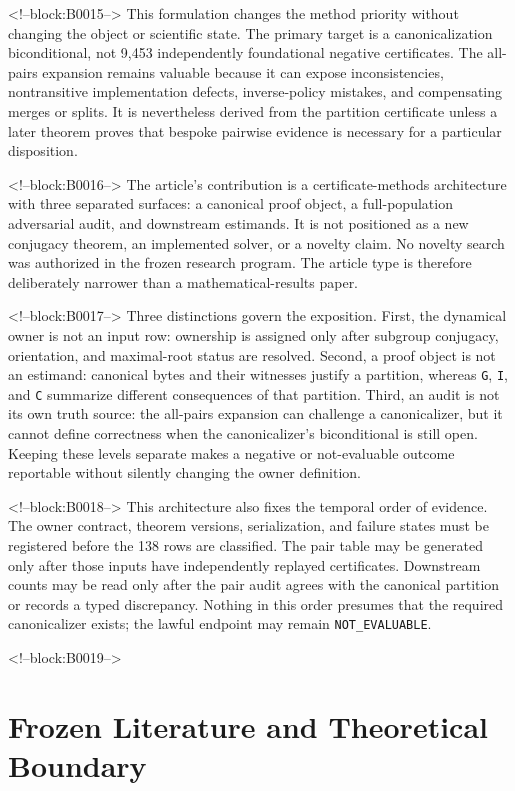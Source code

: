 \documentclass[11pt]{article}
\begin{document}
<!--block:B0015-->
This formulation changes the method priority without changing the object
or scientific state. The primary target is a canonicalization
biconditional, not 9,453 independently foundational negative
certificates. The all-pairs expansion remains valuable because it can
expose inconsistencies, nontransitive implementation defects,
inverse-policy mistakes, and compensating merges or splits. It is
nevertheless derived from the partition certificate unless a later
theorem proves that bespoke pairwise evidence is necessary for a
particular disposition.

<!--block:B0016-->
The article's contribution is a certificate-methods architecture with
three separated surfaces: a canonical proof object, a full-population
adversarial audit, and downstream estimands. It is not positioned as a
new conjugacy theorem, an implemented solver, or a novelty claim. No
novelty search was authorized in the frozen research program. The article type is therefore
deliberately narrower than a mathematical-results paper.

<!--block:B0017-->
Three distinctions govern the exposition. First, the dynamical owner is
not an input row: ownership is assigned only after subgroup conjugacy,
orientation, and maximal-root status are resolved. Second, a proof
object is not an estimand: canonical bytes and their witnesses justify a
partition, whereas \texttt{G}, \texttt{I}, and \texttt{C} summarize
different consequences of that partition. Third, an audit is not its
own truth source: the all-pairs expansion can challenge a canonicalizer,
but it cannot define correctness when the canonicalizer's biconditional
is still open. Keeping these levels separate makes a negative or
not-evaluable outcome reportable without silently changing the owner
definition.

<!--block:B0018-->
This architecture also fixes the temporal order of evidence. The owner
contract, theorem versions, serialization, and failure states must be
registered before the 138 rows are classified. The pair table may be
generated only after those inputs have independently replayed
certificates. Downstream counts may be read only after the pair audit
agrees with the canonical partition or records a typed discrepancy.
Nothing in this order presumes that the required canonicalizer exists;
the lawful endpoint may remain \texttt{NOT\_EVALUABLE}.

<!--block:B0019-->
\hypertarget{2-frozen-literature-and-theoretical-boundary}{%
\section{Frozen Literature and Theoretical
Boundary}\label{2-frozen-literature-and-theoretical-boundary}}
\end{document}
